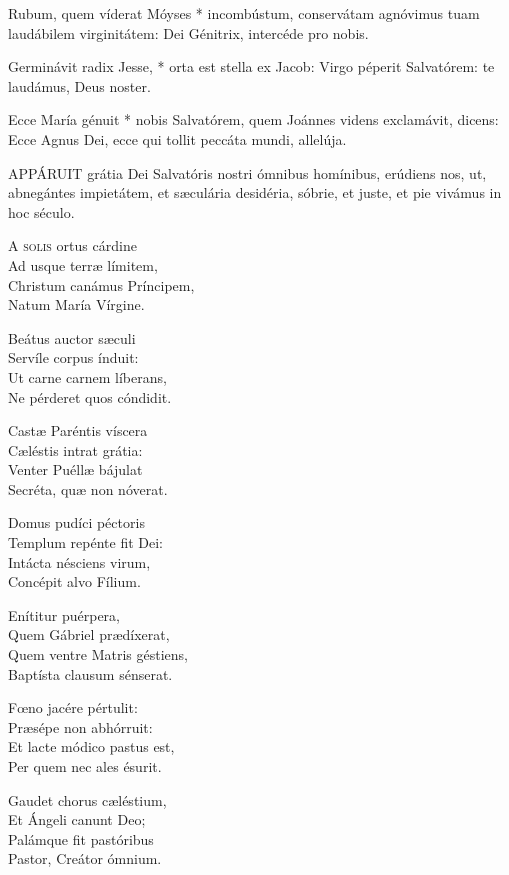  Rubum, quem víderat Móyses * incombústum, conservátam agnóvimus tuam laudábilem virginitátem: Dei Génitrix, intercéde pro nobis.

 Germinávit radix Jesse, * orta est stella ex Jacob: Virgo péperit Salvatórem: te laudámus, Deus noster.

 Ecce María génuit * nobis Salvatórem, quem Joánnes videns exclamávit, dicens: Ecce Agnus Dei, ecce qui tollit peccáta mundi, allelúja.


\lettrine[lines=2]{A}{PPÁRUIT} grátia Dei Salvatóris nostri ómnibus homínibus, erúdiens nos, ut, abnegántes impietátem, et sæculária desidéria, sóbrie, et juste, et pie vivámus in hoc século.


\lettrine[lines=2]{A}{} \textsc{solis} ortus cárdine\\
Ad usque terræ límitem,\\
Christum canámus Príncipem,\\
Natum María Vírgine.

Beátus auctor sæculi\\
Servíle corpus índuit:\\
Ut carne carnem líberans,\\
Ne pérderet quos cóndidit.

Castæ Paréntis víscera\\
Cæléstis intrat grátia:\\
Venter Puéllæ bájulat\\
Secréta, quæ non nóverat.

Domus pudíci péctoris\\
Templum repénte fit Dei:\\
Intácta nésciens virum,\\
Concépit alvo Fílium.

Enítitur puérpera,\\
Quem Gábriel prædíxerat,\\
Quem ventre Matris géstiens,\\
Baptísta clausum sénserat.

Fœno jacére pértulit:\\
Præsépe non abhórruit:\\
Et lacte módico pastus est,\\
Per quem nec ales ésurit.

Gaudet chorus cæléstium,\\
Et Ángeli canunt Deo;\\
Palámque fit pastóribus\\
Pastor, Creátor ómnium.

